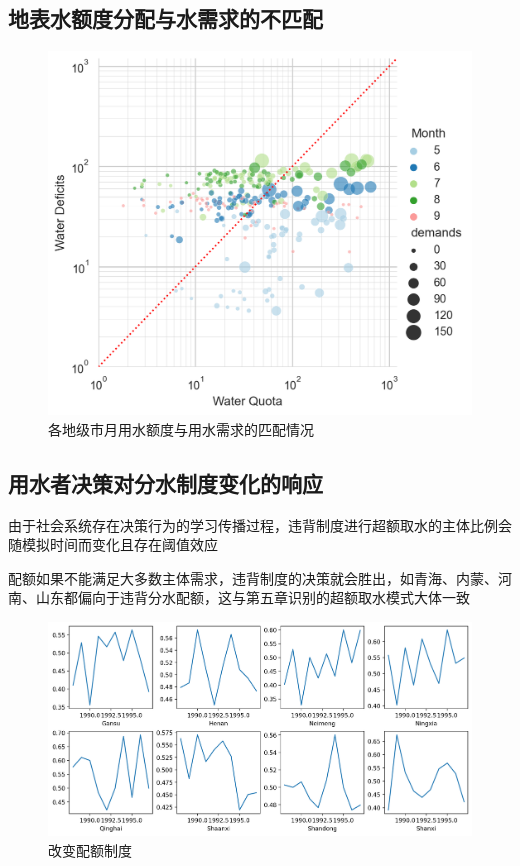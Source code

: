 
\subsection{地表水额度分配与水需求的不匹配}

\begin{figure}[htb]
    \centering
    \includegraphics[width=\textwidth]{img/ch6/ch6_matches.png}
    \caption{各地级市月用水额度与用水需求的匹配情况}\label{ch6:fig:matches}
\end{figure}

\subsection{用水者决策对分水制度变化的响应}

由于社会系统存在决策行为的学习传播过程，违背制度进行超额取水的主体比例会随模拟时间而变化且存在阈值效应

配额如果不能满足大多数主体需求，违背制度的决策就会胜出，如青海、内蒙、河南、山东都偏向于违背分水配额，这与第五章识别的超额取水模式大体一致

\begin{figure}[htb]
    \centering
    \includegraphics[width=\textwidth]{img/ch6/ch6_threshold.png}
    \caption{改变配额制度}\label{fig:xfig0}
\end{figure}

